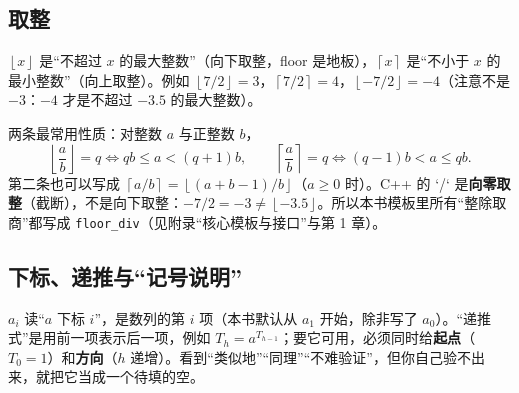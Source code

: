 \documentclass[UTF8,a4paper,11pt,oneside,openany,fontset=fandol]{ctexbook}
\theoremstyle{definition}
\newcommand{\floor}[1]{\left\lfloor #1\right\rfloor}
\newcommand{\ceil}[1]{\left\lceil #1\right\rceil}
\begin{document}
\subsection{取整}
$\floor{x}$ 是“不超过 $x$ 的最大整数”（向下取整，floor 是地板），$\ceil{x}$ 是“不小于 $x$ 的最小整数”（向上取整）。例如 $\floor{7/2}=3$，$\ceil{7/2}=4$，$\floor{-7/2}=-4$（注意不是 $-3$：$-4$ 才是不超过 $-3.5$ 的最大整数）。

两条最常用性质：对整数 $a$ 与正整数 $b$，
\[
\floor{\frac{a}{b}}=q\iff qb\le a<(q+1)b,\qquad \ceil{\frac{a}{b}}=q\iff (q-1)b<a\le qb.
\]
第二条也可以写成 $\ceil{a/b}=\floor{(a+b-1)/b}$（$a\ge0$ 时）。C++ 的 `/` 是\textbf{向零取整}（截断），不是向下取整：$-7/2=-3\ne\floor{-3.5}$。所以本书模板里所有“整除取商”都写成 \texttt{floor\_div}（见附录“核心模板与接口”与第 1 章）。

\subsection{下标、递推与“记号说明”}
$a_i$ 读“$a$ 下标 $i$”，是数列的第 $i$ 项（本书默认从 $a_1$ 开始，除非写了 $a_0$）。“递推式”是用前一项表示后一项，例如 $T_h=a^{T_{h-1}}$；要它可用，必须同时给\textbf{起点}（$T_0=1$）和\textbf{方向}（$h$ 递增）。看到“类似地”“同理”“不难验证”，但你自己验不出来，就把它当成一个待填的空。
\end{document}
